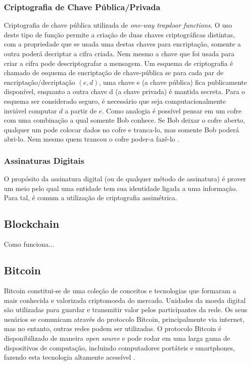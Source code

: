 \documentclass[
	article,			%
	11pt,				%
	oneside,			%
	a4paper,			%
	chapter=TITLE,		%
	section=TITLE,		%
	subsection=TITLE,	%
	subsubsection=TITLE, %
	english,			%
	brazil,				%
	sumario=tradicional
	]{ifrs-artigo-abntex2}
\begin{document}
\subsubsection{Criptografia de Chave Pública/Privada}
Criptografia de chave pública utilizada de \textit{one-way trapdoor functions}. O uso deste tipo de função permite a criação de duas chaves criptográficas distintas, com a propriedade que se usada uma destas chaves para encriptação, somente a outra poderá decriptar a cifra criada. Nem mesmo a chave que foi usada para criar a cifra pode descriptografar a mensagem. Um esquema de criptografia é chamado de esquema de encriptação de chave-pública se para cada par de encriptação/decriptação $(e,d)$, uma chave e (a chave pública) fica publicamente disponível, enquanto a outra chave d (a chave privada) é mantida secreta. Para o esquema ser considerado seguro, é necessário que seja computacionalmente  inviável computar $d$ a partir de $e$. Como analogia é possível pensar em um cofre com uma combinação a qual somente Bob conhece. Se Bob deixar o cofre aberto, qualquer um pode colocar dados no cofre e tranca-lo, mas somente Bob poderá abri-lo. Nem mesmo quem trancou o cofre poder-a fazê-lo \cite{katz1996handbook}.

\subsubsection{Assinaturas Digitais}
O propósito da assinatura digital (ou de qualquer método de assinatura) é prover um meio pelo qual uma entidade tem sua identidade ligada a uma informação. Para tal, é comum a utilização de criptografia assimétrica.

\subsection{Blockchain}
Como funciona...

\subsection{Bitcoin}

Bitcoin constitui-se de uma  coleção de conceitos e tecnologias que formaram a mais conhecida e valorizada criptomoeda do mercado. Unidades da moeda digital são utilizadas para guardar e transmitir valor pelos participantes da rede. Os seus usuários se comunicam através do protocolo Bitcoin, principalmente via internet, mas no entanto, outras redes podem ser utilizadas. O protocolo Bitcoin é disponibilizado de maneira \textit{open source} e pode rodar em uma larga gama de dispositivos de computação, incluindo computadores portáteis e smartphones, fazendo esta tecnologia altamente acessível \cite{masterBit}.
\end{document}
